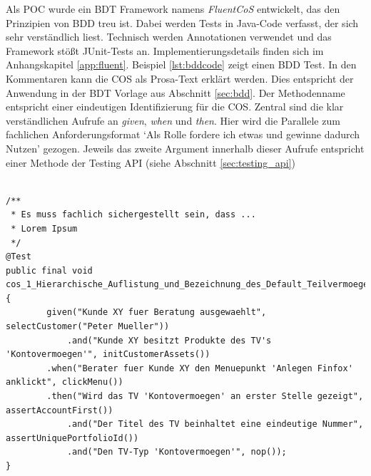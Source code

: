 Als \Gls{POC} wurde ein \Gls{BDT} Framework namens \textit{FluentCoS} entwickelt, das den Prinzipien von \Gls{BDD} treu ist. Dabei werden Tests in Java-Code verfasst, der sich sehr verständlich liest. Technisch werden Annotationen verwendet und das Framework stößt JUnit-Tests an. Implementierungsdetails finden sich im Anhangskapitel \ref{app:fluent}. Beispiel \ref{lst:bddcode} zeigt einen \Gls{BDD} Test. In den Kommentaren kann die \Gls{COS} als Prosa-Text erklärt werden. Dies entspricht der Anwendung in der \Gls{BDT} Vorlage aus Abschnitt \ref{sec:bdd}. Der Methodenname entspricht einer eindeutigen Identifizierung für die \Gls{COS}. Zentral sind die klar verständlichen Aufrufe an \textit{given}, \textit{when} und \textit{then}. Hier wird die Parallele zum fachlichen Anforderungsformat `Als Rolle fordere ich etwas und gewinne dadurch Nutzen' gezogen. Jeweils das zweite Argument innerhalb dieser Aufrufe entspricht einer Methode der Testing API (siehe Abschnitt \ref{sec:testing_api})

\begin{lstlisting}[caption={Beispielhaftes Codestück eines \Gls{BDD} Tests},label=lst:bddcode]

/**
 * Es muss fachlich sichergestellt sein, dass ...
 * Lorem Ipsum
 */
@Test
public final void cos_1_Hierarchische_Auflistung_und_Bezeichnung_des_Default_Teilvermoegens_Kontovermoegen() {
		given("Kunde XY fuer Beratung ausgewaehlt", selectCustomer("Peter Mueller"))
			.and("Kunde XY besitzt Produkte des TV's 'Kontovermoegen'", initCustomerAssets())
		.when("Berater fuer Kunde XY den Menuepunkt 'Anlegen Finfox' anklickt", clickMenu())
		.then("Wird das TV 'Kontovermoegen' an erster Stelle gezeigt", assertAccountFirst())
			.and("Der Titel des TV beinhaltet eine eindeutige Nummer", assertUniquePortfolioId())
			.and("Den TV-Typ 'Kontovermoegen'", nop());
}
\end{lstlisting}

